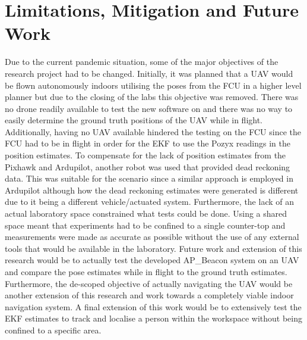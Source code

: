 \section{Limitations, Mitigation and Future Work}\label{sec:limitations,-mitigations-and-future-work}
Due to the current pandemic situation, some of the major objectives of the research project had to be changed.
Initially, it was planned that a UAV would be flown autonomously indoors utilising the poses from the FCU in a higher level planner but due to the closing of the labs this objective was removed.
There was no drone readily available to test the new software on and there was no way to easily determine the ground truth positions of the UAV while in flight.
Additionally, having no UAV available hindered the testing on the FCU since the FCU had to be in flight in order for the EKF to use the Pozyx readings in the position estimates.
To compensate for the lack of position estimates from the Pixhawk and Ardupilot, another robot was used that provided dead reckoning data.
This was suitable for the scenario since a similar approach is employed in Ardupilot although how the dead reckoning estimates were generated is different due to it being a different vehicle/actuated system.
Furthermore, the lack of an actual laboratory space constrained what tests could be done.
Using a shared space meant that experiments had to be confined to a single counter-top and measurements were made as accurate as possible without the use of any external tools that would be available in the laboratory.
Future work and extension of this research would be to actually test the developed AP\_Beacon system on an UAV and compare the pose estimates while in flight to the ground truth estimates.
Furthermore, the de-scoped objective of actually navigating the UAV would be another extension of this research and work towards a completely viable indoor navigation system.
A final extension of this work would be to extensively test the EKF estimates to track and localise a person within the workspace without being confined to a specific area.
